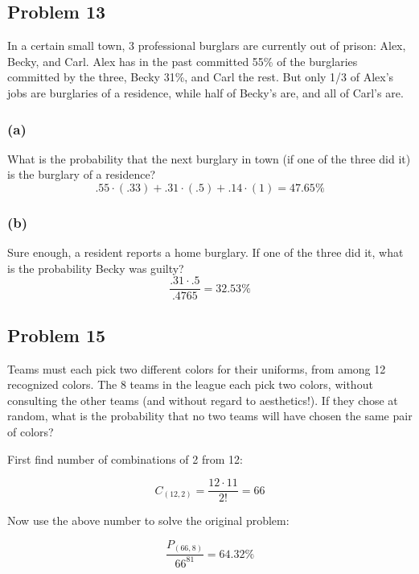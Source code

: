 \documentclass{article}
\begin{document}
\subsection*{Problem 13}
In a certain small town, 3 professional burglars are currently out of prison: Alex, Becky, and Carl. Alex has in the past committed 55\% of the burglaries committed by the three, Becky 31\%, and Carl the rest. But only 1/3 of Alex’s jobs are burglaries of a residence, while half of Becky’s are, and all of Carl’s are.
\subsubsection*{(a)}
What is the probability that the next burglary in town (if one of the three did it) is the burglary of a residence?
\begin{equation}
    .55\cdot(.33) + .31\cdot(.5) + .14\cdot(1)= \boxed{47.65\%}
\end{equation}
\subsubsection*{(b)}
Sure enough, a resident reports a home burglary. If one of the three did it, what is the probability Becky was guilty?
\begin{equation}
    \frac{.31\cdot.5}{.4765} = \boxed{32.53\%}
\end{equation}
\subsection*{Problem 15}
Teams must each pick two different colors for their uniforms, from among 12 recognized colors. The 8 teams in the league each pick two colors, without consulting the other teams (and without regard to aesthetics!). If they chose at random, what is the probability that no two teams will have chosen the same pair of colors?
\begin{center}
    First find number of combinations of 2 from 12:
\end{center}
\begin{equation}
    C_{(12,2)} = \frac{12\cdot11}{2!} = 66
\end{equation}
\begin{center}
    Now use the above number to solve the original problem:
\end{center}
\begin{equation}
    \frac{P_{(66,8)}}{66^81} = \boxed{64.32\%}
\end{equation}
\end{document}
